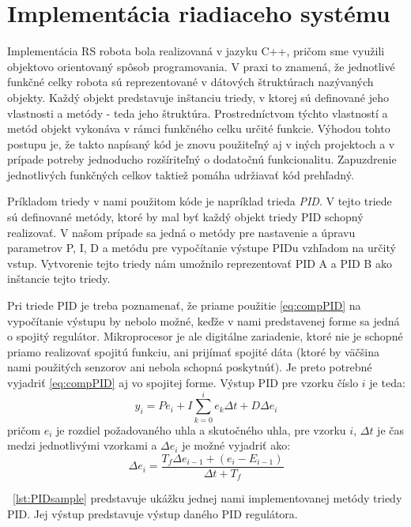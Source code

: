 \section{Implementácia riadiaceho systému}
Implementácia \ac{RS} robota bola realizovaná v jazyku C++, pričom sme využili objektovo orientovaný spôsob programovania. V praxi to znamená, že jednotlivé funkčné celky robota sú reprezentované v dátových štruktúrach nazývaných objekty. Každý objekt predstavuje inštanciu triedy, v ktorej sú definované jeho vlastnosti a metódy - teda jeho štruktúra. Prostredníctvom týchto vlastností a metód objekt vykonáva v rámci funkčného celku určité funkcie. Výhodou tohto postupu je, že takto napísaný kód je znovu použiteľný aj v iných projektoch a v prípade potreby jednoducho rozšíriteľný o dodatočnú funkcionalitu. Zapuzdrenie jednotlivých funkčných celkov taktiež pomáha udržiavať kód prehľadný.

Príkladom triedy v nami použitom kóde je napríklad trieda \textit{PID}. V tejto triede sú definované metódy, ktoré by mal byť každý objekt triedy PID schopný realizovať. V našom prípade sa jedná o metódy pre nastavenie a úpravu parametrov P, I, D a metódu pre vypočítanie výstupe PIDu vzhľadom na určitý vstup. Vytvorenie tejto triedy nám umožnilo reprezentovať PID A a PID B ako inštancie tejto triedy. 

Pri triede PID je treba poznamenať, že priame použitie \ref{eq:compPID} na vypočítanie výstupu by nebolo možné, keďže v nami predstavenej forme sa jedná o spojitý regulátor. Mikroprocesor je ale digitálne zariadenie, ktoré nie je schopné priamo realizovať spojitú funkciu, ani prijímať spojité dáta (ktoré by väčšina nami použitých senzorov ani nebola schopná poskytnúť). Je preto potrebné vyjadriť \ref{eq:compPID} aj vo spojitej forme. Výstup PID pre vzorku číslo $i$ je teda:
\begin{equation}
y_i = Pe_i + I\sum_{k=0}^{i}{e_k}\Delta t + D\Delta e_i 
\end{equation}
pričom $e_i$ je rozdiel požadovaného uhla a skutočného uhla, pre vzorku $i$, $\Delta t$ je čas medzi jednotlivými vzorkami a $\Delta e_i$ je možné vyjadriť ako:
\begin{equation}
\Delta e_i = \dfrac{T_f\Delta e_{i-1} + (e_i - E_{i-1})}{\Delta t + T_f}
\end{equation}


\listingname~\ref{lst:PIDsample} predstavuje ukážku jednej nami implementovanej metódy triedy PID. Jej výstup predstavuje výstup daného PID regulátora.  


